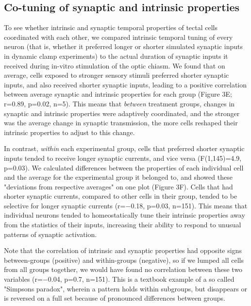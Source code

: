 \documentclass{article}
\begin{document}
\subsection*{Co-tuning of synaptic and intrinsic properties}

To see whether intrinsic and synaptic temporal properties of tectal cells coordinated with each other, we compared intrinsic temporal tuning of every neuron (that is, whether it preferred longer or shorter simulated synaptic inputs in dynamic clamp experiments) to the actual duration of synaptic inputs it received during in-vitro stimulation of the optic chiasm. We found that on average, cells exposed to stronger sensory stimuli preferred shorter synaptic inputs, and also received shorter synaptic inputs, leading to a positive correlation between average synaptic and intrinsic properties for each group (Figure 3E; r=0.89, p=0.02, n=5). This means that \textit{between} treatment groups, changes in synaptic and intrinsic properties were adaptively coordinated, and the stronger was the average change in synaptic transmission, the more cells reshaped their intrinsic properties to adjust to this change.

In contrast, \textit{within} each experimental group, cells that preferred shorter synaptic inputs tended to receive longer synaptic currents, and vice versa (F(1,145)=4.9, p=0.03). We calculated differences between the properties of each individual cell and the average for the experimental group it belonged to, and showed these "deviations from respective averages" on one plot (Figure 3F). Cells that had shorter synaptic currents, compared to other cells in their group, tended to be selective for longer synaptic currents (r=$-$0.18, p=0.03, n=151). This means that individual neurons tended to homeostatically tune their intrinsic properties away from the statistics of their inputs, increasing their ability to respond to unusual patterns of synaptic activation. 

Note that the correlation of intrinsic and synaptic properties had opposite signs between-groups (positive) and within-groups (negative), so if we lumped all cells from all groups together, we would have found no correlation between these two variables (r=$-$0.04, p=0.7, n=151). This is a textbook example of a so called "Simpsons paradox", wherein a pattern holds within subgroups, but disappears or is reversed on a full set because of pronounced differences between groups.
\end{document}
